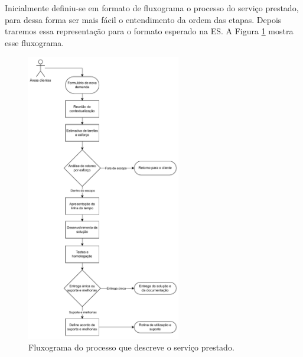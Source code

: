 	Inicialmente definiu-se em formato de fluxograma o processo do serviço prestado, para dessa forma ser 
	mais fácil o entendimento da ordem das etapas. Depois traremos essa representação para o formato esperado
	na ES. A Figura \ref{fig:metodologia:processFlow} mostra esse fluxograma.
	
	\begin{figure}[!tb]
		\centering
		\includegraphics[width=0.6\textwidth]{./figuras/processFlow.pdf}
		\caption{Fluxograma do processo que descreve o serviço prestado.}
		\label{fig:metodologia:processFlow}
	\end{figure}
	
